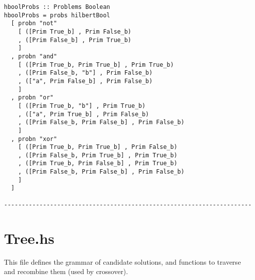 \documentclass{article}
\begin{document}
\begin{lstlisting}
hboolProbs :: Problems Boolean
hboolProbs = probs hilbertBool
  [ probn "not"
    [ ([Prim True_b] , Prim False_b)
    , ([Prim False_b] , Prim True_b)
    ]
  , probn "and"
    [ ([Prim True_b, Prim True_b] , Prim True_b)
    , ([Prim False_b, "b"] , Prim False_b)
    , (["a", Prim False_b] , Prim False_b)
    ]
  , probn "or"
    [ ([Prim True_b, "b"] , Prim True_b)
    , (["a", Prim True_b] , Prim False_b)
    , ([Prim False_b, Prim False_b] , Prim False_b)
    ]
  , probn "xor"
    [ ([Prim True_b, Prim True_b] , Prim False_b)
    , ([Prim False_b, Prim True_b] , Prim True_b)
    , ([Prim True_b, Prim False_b] , Prim True_b)
    , ([Prim False_b, Prim False_b] , Prim False_b)
    ]
  ]

----------------------------------------------------------------------
\end{lstlisting}

\section{Tree.hs}

This file defines the grammar of candidate solutions, and functions to
traverse and recombine them (used by crossover).
\end{document}

